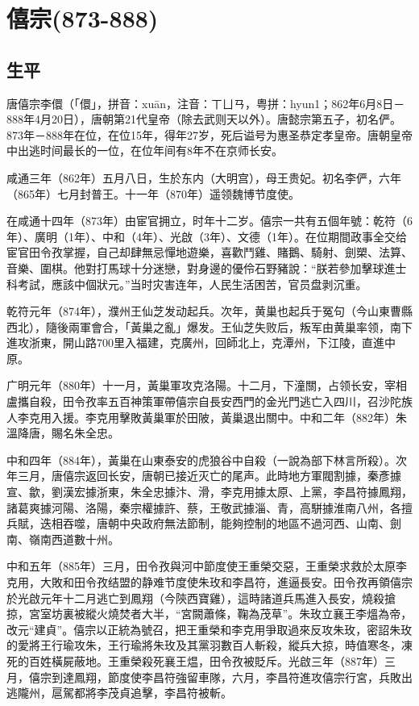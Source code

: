 
\section{僖宗\tiny(873-888)}

\subsection{生平}

唐僖宗李儇（「儇」，拼音：xuān，注音：ㄒㄩㄢ，粤拼：hyun1；862年6月8日－888年4月20日），唐朝第21代皇帝（除去武则天以外）。唐懿宗第五子，初名俨。873年－888年在位，在位15年，得年27岁，死后谥号为惠圣恭定孝皇帝。唐朝皇帝中出逃时间最长的一位，在位年间有8年不在京师长安。

咸通三年（862年）五月八日，生於东内（大明宫），母王贵妃。初名李俨，六年（865年）七月封普王。十一年（870年）遥领魏博节度使。

在咸通十四年（873年）由宦官拥立，时年十二岁。僖宗一共有五個年號：乾符（6年）、廣明（1年）、中和（4年）、光啟（3年）、文德（1年）。在位期間政事全交给宦官田令孜掌握，自己却肆無忌憚地遊樂，喜歡鬥雞、賭鵝、騎射、劍槊、法算、音樂、圍棋。他對打馬球十分迷戀，對身邊的優伶石野豬說：“朕若參加擊球進士科考試，應該中個狀元。”当时灾害连年，人民生活困苦，官员盘剥沉重。

乾符元年（874年），濮州王仙芝发动起兵。次年，黄巢也起兵于冤句（今山東曹縣西北），隨後兩軍會合，「黃巢之亂」爆发。王仙芝失败后，叛军由黄巢率领，南下進攻浙東，開山路700里入福建，克廣州，回師北上，克潭州，下江陵，直進中原。

广明元年（880年）十一月，黃巢軍攻克洛陽。十二月，下潼關，占领长安，宰相盧攜自殺，田令孜率五百神策軍帶僖宗自長安西門的金光門逃亡入四川，召沙陀族人李克用入援。李克用擊敗黃巢軍於田陂，黃巢退出關中。中和二年（882年）朱溫降唐，賜名朱全忠。

中和四年（884年），黃巢在山東泰安的虎狼谷中自殺（一說為部下林言所殺）。次年三月，唐僖宗返回长安，唐朝已接近灭亡的尾声。此時地方軍閥割據，秦彥據宣、歙，劉漢宏據浙東，朱全忠據汴、滑，李克用據太原、上黨，李昌符據鳳翔，諸葛爽據河陽、洛陽，秦宗權據許、蔡，王敬武據淄、青，高駢據淮南八州，各擅兵賦，迭相吞噬，唐朝中央政府無法節制，能夠控制的地區不過河西、山南、劍南、嶺南西道數十州。

中和五年（885年）三月，田令孜與河中節度使王重榮交惡，王重榮求救於太原李克用，大敗和田令孜结盟的静难节度使朱玫和李昌符，進逼長安。田令孜再領僖宗於光啟元年十二月逃亡到鳳翔（今陝西寶雞），這時諸道兵馬進入長安，燒殺搶掠，宮室坊裏被縱火燒焚者大半，“宮闕蕭條，鞠為茂草”。朱玫立襄王李熅為帝，改元“建貞”。僖宗以正統為號召，把王重榮和李克用爭取過來反攻朱玫，密詔朱玫的愛將王行瑜攻朱，王行瑜將朱玫及其黨羽數百人斬殺，縱兵大掠，時值寒冬，凍死的百姓橫屍蔽地。王重榮殺死襄王煴，田令孜被貶斥。光啟三年（887年）三月，僖宗到達鳳翔，節度使李昌符強留車隊，六月，李昌符進攻僖宗行宮，兵敗出逃隴州，扈駕都將李茂貞追擊，李昌符被斬。

